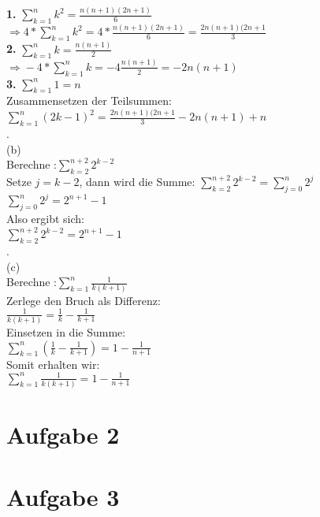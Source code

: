 \documentclass{article}
\begin{document}
\begin{center}
\textbf{1.} $\sum_{k=1}^{n} k^2 = \frac{n(n+1)(2n+1)}{6}$ \\
    $\Longrightarrow{}$$4*\sum_{k=1}^{n} k^2 = 4*\frac{n(n+1)(2n+1)}{6} = \frac{2n(n+1)(2n+1}{3}$ \\
\textbf{2.} $\sum_{k=1}^{n} k = \frac{n(n+1)}{2}$ \\
    $\Longrightarrow{} -4*\sum_{k=1}^{n}k = -4\frac{n(n+1)}{2} = -2n(n+1)$ \\
\textbf{3.} $\sum_{k=1}^{n} 1 = n$ \\
Zusammensetzen der Teilsummen:
$\sum_{k=1}^{n}(2k-1)^2 = \frac{2n(n+1)(2n+1}{3} -2n(n+1) + n$ \\
.\\
(b) \\
Berechne :$\sum_{k=2}^{n+2}2^{k-2}$ \\
Setze \( j = k - 2 \), dann wird die Summe:
$\sum_{k=2}^{n+2} 2^{k-2} = \sum_{j=0}^{n} 2^j$ \\
$\sum_{j=0}^{n} 2^j = 2^{n+1} - 1$ \\
Also ergibt sich: \\
$\sum_{k=2}^{n+2} 2^{k-2} = 2^{n+1} - 1 $\\

.\\
(c) \\
Berechne :$\sum_{k=1}^{n}\frac{1}{k(k+1)}$ \\
Zerlege den Bruch als Differenz: \\
$\frac{1}{k(k+1)} = \frac{1}{k} - \frac{1}{k+1}$ \\
Einsetzen in die Summe: \\
$\sum_{k=1}^n \left( \frac{1}{k} - \frac{1}{k+1} \right) = 1 - \frac{1}{n+1}$ \\
Somit erhalten wir: \\
$\sum_{k=1}^n \frac{1}{k(k+1)} = 1 - \frac{1}{n+1}$ \\


\end{center}

\section{Aufgabe 2}


\section{Aufgabe 3}
\end{document}
